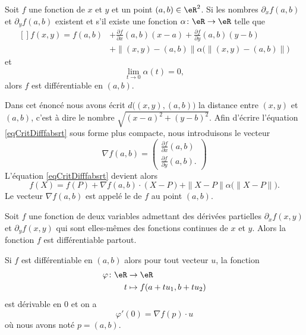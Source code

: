 \begin{proposition} \label{PropExistDiffUn}
    Soit $f$ une fonction de $x$ et $y$ et un point $(a,b)\in\eR^2$. Si les nombres $\partial_xf(a,b)$ et $\partial_yf(a,b)$ existent et s'il existe une fonction $\alpha\colon \eR\to \eR$ telle que
    \begin{equation}        \label{eqCritDifffabsrt}
        \begin{aligned}[]
            f(x,y)=f(a,b)&+\frac{ \partial f }{ \partial x }(a,b)(x-a)+\frac{ \partial f }{ \partial y }(a,b)(y-b)\\
            &+\| (x,y)-(a,b) \| \alpha\Big( \| (x,y)-(a,b) \| \Big)
        \end{aligned}
    \end{equation}
    et
    \begin{equation}
        \lim_{t\to 0} \alpha(t)=0,
    \end{equation}
    alors $f$ est différentiable en $(a,b)$.
\end{proposition}
Dans cet énoncé nous avons écrit $d\big( (x,y),(a,b) \big)$ la distance entre $(x,y)$ et $(a,b)$, c'est à dire le nombre $\sqrt{(x-a)^2+(y-b)^2}$. Afin d'écrire l'équation \eqref{eqCritDifffabsrt} sous forme plus compacte, nous introduisons le vecteur
\begin{equation}
    \nabla f(a,b)=\begin{pmatrix}
        \frac{ \partial f }{ \partial x }(a,b)    \\ 
        \frac{ \partial f }{ \partial y }(a,b).    
    \end{pmatrix}
\end{equation}
L'équation \eqref{eqCritDifffabsrt} devient alors
\begin{equation}        \label{EqdiffComp}
    f(X)=f(P)+\nabla f(a,b)\cdot (X-P)+\| X-P \|\alpha\big( \| X-P \| \big).
\end{equation}
Le vecteur $\nabla f(a,b)$ est appelé le  de $f$ au point $(a,b)$.

\begin{proposition} \label{PropExistDiffDeux}
    Soit $f$ une fonction de deux variables admettant des dérivées partielles $\partial_xf(x,y)$ et $\partial_yf(x,y)$ qui sont elles-mêmes des fonctions continues de $x$ et $y$. Alors la fonction $f$ est différentiable partout.
\end{proposition}

\begin{proposition}
    Si $f$ est différentiable en $(a,b)$ alors pour tout vecteur \( u\), la fonction
    \begin{equation}
        \begin{aligned}
            \varphi\colon \eR&\to \eR \\
            t&\mapsto   f(a+tu_1,b+tu_2) 
        \end{aligned}
    \end{equation}
    est dérivable en $0$ et on a
    \begin{equation}
        \varphi'(0)=\nabla f(p)\cdot u
    \end{equation}
    où nous avons noté $p=(a,b)$.
\end{proposition}

